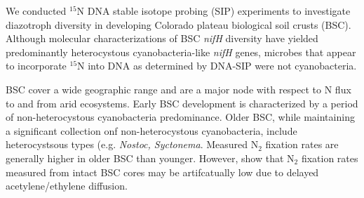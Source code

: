We conducted $^{15}$N DNA stable isotope probing (SIP) experiments to investigate diazotroph diversity in developing Colorado plateau biological soil crusts (BSC). Although molecular characterizations of BSC \textit{nifH} diversity have yielded predominantly heterocystous cyanobacteria-like \textit{nifH} genes, microbes that appear to incorporate $^{15}$N into DNA as determined by DNA-SIP were not cyanobacteria.

BSC cover a wide geographic range and are a major node with respect to N flux to and from arid ecosystems. Early BSC development is characterized by a period of non-heterocystous cyanobacteria predominance. Older BSC, while maintaining a significant collection onf non-heterocystous cyanobacteria, include heterocystsous types (e.g. \textit{Nostoc, Syctonema}. Measured N$_{2}$ fixation rates are generally higher in older BSC than younger. However, \citep{15643930} show that N$_{2}$ fixation rates measured from intact BSC cores may be artifcatually low due to delayed acetylene/ethylene diffusion. 


